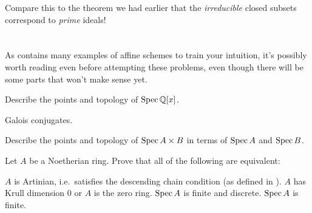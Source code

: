 Compare this to the theorem we had earlier
that the \emph{irreducible} closed subsets correspond to \emph{prime} ideals!

\section{\problemhead}
As  contains many
examples of affine schemes to train your intuition,
it's possibly worth reading even before attempting these problems,
even though there will be some parts that won't make sense yet.

\begin{problem}
	[{$\Spec \QQ[x]$}]
	Describe the points and topology of $\Spec \QQ[x]$.
	\begin{hint}
		Galois conjugates.
	\end{hint}
\end{problem}

\begin{problem}
	Describe the points and topology of $\operatorname{Spec} A \times B$
	in terms of $\Spec A$ and $\operatorname{Spec} B$.
\end{problem}

\begin{sproblem}
	\label{prob:artinian}
	Let $A$ be a Noetherian ring.
	Prove that all of the following are equivalent:
	\begin{enumerate}[(i)]
		\ii $A$ is Artinian, i.e.\ satisfies the descending chain condition
		(as defined in ).
		\ii $A$ has Krull dimension $0$ or $A$ is the zero ring.
		\ii $\Spec A$ is finite and discrete.
		\ii $\Spec A$ is finite.
	\end{enumerate}
\end{sproblem}

\endinput

\begin{problem}
	[From Andrew Critch]
	\onechili
	Let $A$ be a Noetherian ring.
	Show that $A$ is an integral domain if and only if it has no idempotents,
	and $A_\kp$ is an integral domain for every prime $\kp$.
	\begin{hint}
		Show that if $\Spec A$ is connected and its stalks are irreducible,
		then $\Spec A$ is itself irreducible.
		Consider nilradical $N = \sqrt{(0)}$.
	\end{hint}
	\begin{sol}
		This is the proposition on the second page of
		\url{https://www.acritch.com/media/math/Stalk-local_detection_of_irreducibility.pdf}
	\end{sol}
\end{problem}
